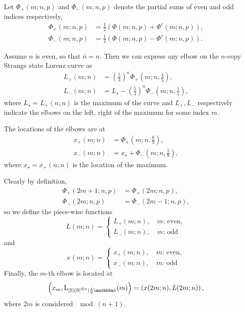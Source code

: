 \documentclass[pra,
aps,
twocolumn,
superscriptaddress,
groupedaddress,
nofootinbib,
reprint
]{revtex4-1}
\begin{document}
Let $\Phi_+(m; n, p)$ and $\Phi_-(m; n, p)$ denote the partial sums of even and odd indices respectively,
\begin{align}	
	\Phi_+(m; n, p) &= \frac{1}{2} \left( \Phi(m; n, p) + \Phi^c(m; n, p) \right), \\
	\Phi_-(m; n, p) &= \frac{1}{2} \left( \Phi(m; n, p) - \Phi^c(m; n, p) \right).
\end{align}

Assume $n$ is even, so that $\bar n = n$.
Then we can express any elbow on the $n$-copy Strange state Lorenz curve as
\begin{align}
	L_+(m; n) &= \left(\frac{5}{3}\right)^n \Phi_+\left(m;n,\frac{4}{5}\right), \label{eq:leftelb}\\
	L_-(m; n) &= L_\star - \left(\frac{5}{3}\right)^n \Phi_-\left(m;n,\frac{1}{5}\right), \label{eq:rightelb}
\end{align}
where $L_\star = L_+(n; n)$ is the maximum of the curve and $L_+, L_-$ respectively indicate the elbows on the left, right of the maximum for some index $m$.

The locations of the elbows are at
\begin{align}
	x_+(m; n) &= \Phi_+\left(m;n,\frac{8}{9}\right), \\
	x_-(m; n) &= x_\star + \Phi_-\left(m;n,\frac{1}{9}\right),
\end{align}
where $x_\star = x_+(n; n)$ is the location of the maximum.

Clearly by definition, 
\begin{align}
	\Phi_+(2m+1;n,p) &= \Phi_+(2m;n,p), \\
	\Phi_-(2m;n,p) &= \Phi_-(2m-1;n,p),
\end{align}
so we define the piece-wise functions
\begin{equation}
	L(m;n) =
	\begin{cases}
	L_+(m; n),&\ m\text{: even}, \\
	L_-(m; n),&\ m\text{: odd}
	\end{cases}
\end{equation}
and
\begin{equation}
	x(m;n) =
	\begin{cases}
	x_+(m; n),&\ m\text{: even}, \\
	x_-(m; n),&\ m\text{: odd}
	\end{cases}
\end{equation}
Finally, the $m$-th elbow is located at
\begin{equation}\label{eq:slc}
	\left(x_m, \lc{\ketbra{\rm{S}}^{\otimes n}}{\frac{1}{d}\id}(m) \right) = \left( x(2m;n), L(2m;n) \right),
\end{equation}
where $2m$ is considered \hspace{-7pt}$\mod{(n+1)}$.
\end{document}
